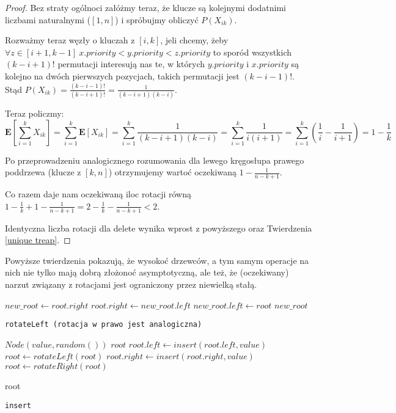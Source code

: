 \begin{proof}
Bez straty ogólnoci załóżmy teraz, że klucze są kolejnymi dodatnimi liczbami naturalnymi ($[1,n]$) i spróbujmy obliczyć $P(X_{ik})$.

Rozważmy teraz węzły o kluczah z $[i, k]$, jeli chcemy, żeby $\forall z\in[i+1,k-1]\ x.priority < y.priority < z.priority$ to sporód wszystkich $(k-i+1)!$ permutacji interesują nas te, w których $y.priority$ i $x.priority$ są kolejno na dwóch pierwszych pozycjach, takich permutacji jest  $(k-i-1)!$.
Stąd $P(X_{ik}) = \frac{(k -i - 1)!}{(k -i + 1)!} =  \frac{1}{(k-i+1)(k-i)}$.

Teraz policzmy:
$$
\mathbf{E}[\sum_{i=1}^{k}X_{ik}]=
\sum_{i=1}^{k}\mathbf{E}[X_{ik}]=
\sum_{i=1}^{k}\frac{1}{(k-i+1)(k-i)}=
\sum_{i=1}^{k}\frac{1}{i(i+1)}=
\sum_{i=1}^{k}(\frac{1}{i}-\frac{1}{i+1})=
1-\frac{1}{k}
$$

Po przeprowadzeniu analogicznego rozumowania dla lewego kręgosłupa prawego poddrzewa (klucze z $[k,n]$) otrzymujemy wartoć oczekiwaną $1 - \frac{1}{n-k+1}$.

Co razem daje nam oczekiwaną iloc rotacji równą $1 - \frac{1}{k} + 1 - \frac{1}{n-k+1} = 2 -  \frac{1}{k} - \frac{1}{n-k+1} < 2$.

Identyczna liczba rotacji dla delete wynika wprost z powyższego oraz Twierdzenia \ref{unique treap}.
\end{proof}

Powyższe twierdzenia pokazują, że wysokoć drzewców, a tym samym operacje na nich nie tylko mają dobrą złożonoć asymptotyczną, ale też, że (oczekiwany) narzut związany z rotacjami jest ograniczony przez niewielką stałą.

\begin{algorithm}
  \DontPrintSemicolon


  $new\_root \leftarrow root.right$\;
  $root.right \leftarrow new\_root.left$\;
  $new\_root.left \leftarrow root$\;
  \Return $new\_root$\;
  
  \caption{\texttt{rotateLeft (rotacja w prawo jest analogiczna)}}
  \label{treap-rotate-left}
\end{algorithm}

\begin{algorithm}
  \DontPrintSemicolon

  {
    \Return $Node(value, random())$\;
  }
  {
    \Return $root$\;
  }
  {
    $root.left \leftarrow insert(root.left, value)$\;
    {
      $root \leftarrow rotateLeft(root)$\;
    }
  }
  {
    $root.right \leftarrow insert(root.right, value)$\;
    {
      $root \leftarrow rotateRight(root)$\;
    }
  }
  
  \Return root\;
  \caption{\texttt{insert}}
  \label{treap-insert}
\end{algorithm}

